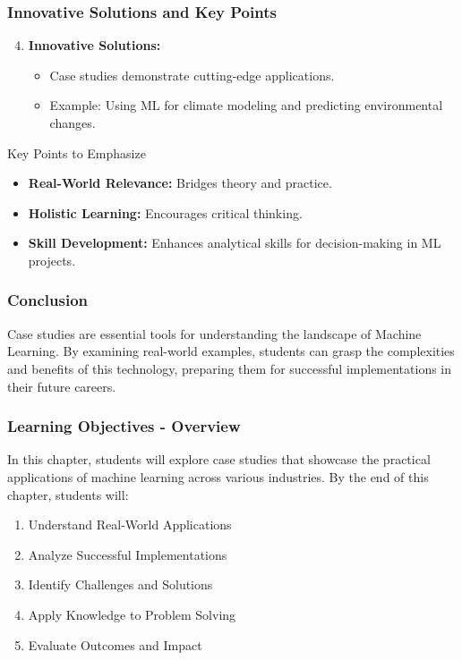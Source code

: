 \documentclass{beamer}
\begin{document}
\begin{frame}[fragile]
    \frametitle{Innovative Solutions and Key Points}
    \begin{enumerate}
        \setcounter{enumi}{3}
        \item \textbf{Innovative Solutions:}
        \begin{itemize}
            \item Case studies demonstrate cutting-edge applications.
            \item Example: Using ML for climate modeling and predicting environmental changes.
        \end{itemize}
    \end{enumerate}

    \begin{block}{Key Points to Emphasize}
        \begin{itemize}
            \item \textbf{Real-World Relevance:} Bridges theory and practice.
            \item \textbf{Holistic Learning:} Encourages critical thinking.
            \item \textbf{Skill Development:} Enhances analytical skills for decision-making in ML projects.
        \end{itemize}
    \end{block}
\end{frame}

\begin{frame}[fragile]
    \frametitle{Conclusion}
    Case studies are essential tools for understanding the landscape of Machine Learning. By examining real-world examples, students can grasp the complexities and benefits of this technology, preparing them for successful implementations in their future careers.
\end{frame}

\begin{frame}[fragile]
    \frametitle{Learning Objectives - Overview}
    In this chapter, students will explore case studies that showcase the practical applications of machine learning across various industries. By the end of this chapter, students will:
    \begin{enumerate}
        \item Understand Real-World Applications
        \item Analyze Successful Implementations
        \item Identify Challenges and Solutions
        \item Apply Knowledge to Problem Solving
        \item Evaluate Outcomes and Impact
    \end{enumerate}
\end{frame}
\end{document}
